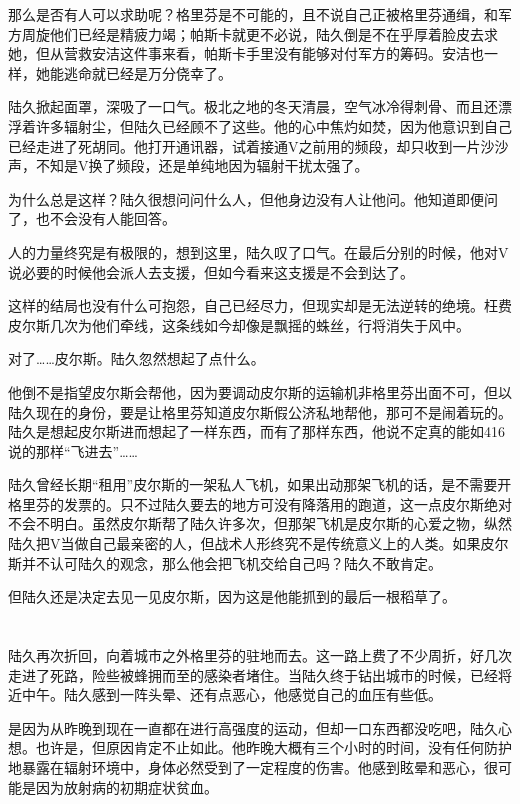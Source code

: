 那么是否有人可以求助呢？格里芬是不可能的，且不说自己正被格里芬通缉，和军方周旋他们已经是精疲力竭；帕斯卡就更不必说，陆久倒是不在乎厚着脸皮去求她，但从营救安洁这件事来看，帕斯卡手里没有能够对付军方的筹码。安洁也一样，她能逃命就已经是万分侥幸了。

陆久掀起面罩，深吸了一口气。极北之地的冬天清晨，空气冰冷得刺骨、而且还漂浮着许多辐射尘，但陆久已经顾不了这些。他的心中焦灼如焚，因为他意识到自己已经走进了死胡同。他打开通讯器，试着接通V之前用的频段，却只收到一片沙沙声，不知是V换了频段，还是单纯地因为辐射干扰太强了。

为什么总是这样？陆久很想问问什么人，但他身边没有人让他问。他知道即便问了，也不会没有人能回答。

人的力量终究是有极限的，想到这里，陆久叹了口气。在最后分别的时候，他对V说必要的时候他会派人去支援，但如今看来这支援是不会到达了。

这样的结局也没有什么可抱怨，自己已经尽力，但现实却是无法逆转的绝境。枉费皮尔斯几次为他们牵线，这条线如今却像是飘摇的蛛丝，行将消失于风中。

对了……皮尔斯。陆久忽然想起了点什么。

他倒不是指望皮尔斯会帮他，因为要调动皮尔斯的运输机非格里芬出面不可，但以陆久现在的身份，要是让格里芬知道皮尔斯假公济私地帮他，那可不是闹着玩的。陆久是想起皮尔斯进而想起了一样东西，而有了那样东西，他说不定真的能如416说的那样“飞进去”……

陆久曾经长期“租用”皮尔斯的一架私人飞机，如果出动那架飞机的话，是不需要开格里芬的发票的。只不过陆久要去的地方可没有降落用的跑道，这一点皮尔斯绝对不会不明白。虽然皮尔斯帮了陆久许多次，但那架飞机是皮尔斯的心爱之物，纵然陆久把V当做自己最亲密的人，但战术人形终究不是传统意义上的人类。如果皮尔斯并不认可陆久的观念，那么他会把飞机交给自己吗？陆久不敢肯定。

但陆久还是决定去见一见皮尔斯，因为这是他能抓到的最后一根稻草了。

\section*{}

陆久再次折回，向着城市之外格里芬的驻地而去。这一路上费了不少周折，好几次走进了死路，险些被蜂拥而至的感染者堵住。当陆久终于钻出城市的时候，已经将近中午。陆久感到一阵头晕、还有点恶心，他感觉自己的血压有些低。

是因为从昨晚到现在一直都在进行高强度的运动，但却一口东西都没吃吧，陆久心想。也许是，但原因肯定不止如此。他昨晚大概有三个小时的时间，没有任何防护地暴露在辐射环境中，身体必然受到了一定程度的伤害。他感到眩晕和恶心，很可能是因为放射病的初期症状贫血。

